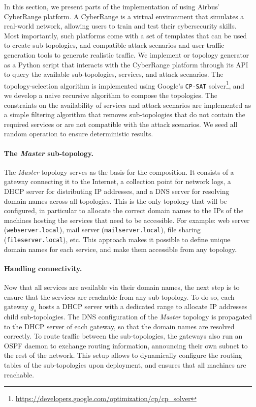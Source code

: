 In this section, we present parts of the implementation of \thecontrib using Airbus' CyberRange platform.
A CyberRange is a virtual environment that simulates a real-world network, allowing users to train and test their cybersecurity skills.
Most importantly, such platforms come with a set of templates that can be used to create sub-topologies, and compatible attack scenarios and user traffic generation tools to generate realistic traffic.
We implement or topology generator as a Python script that interacts with the CyberRange platform through its API to query the available sub-topologies, services, and attack scenarios.
The topology-selection algorithm is implemented using Google's \texttt{CP-SAT} solver\footnote{\url{https://developers.google.com/optimization/cp/cp_solver}}, and we develop a naive recursive algorithm to compose the topologies.
The constraints on the availability of services and attack scenarios are implemented as a simple filtering algorithm that removes sub-topologies that do not contain the required services or are not compatible with the attack scenarios.
We seed all random operation to ensure deterministic results.


\paragraph{The \emph{Master} sub-topology.}

The \emph{Master} topology serves as the basis for the composition.
It consists of a gateway connecting it to the Internet, a collection point for network logs, a DHCP server for distributing IP addresses, and a DNS server for resolving domain names across all topologies.
This is the only topology that will be configured, in particular to allocate the correct domain names to the IPs of the machines hosting the services that need to be accessible.
For example: web server (\texttt{webserver.local}), mail server (\texttt{mailserver.local}), file sharing (\texttt{fileserver.local}), etc.
This approach makes it possible to define unique domain names for each service, and make them accessible from any topology.


\paragraph{Handling connectivity.}

Now that all services are available via their domain names, the next step is to ensure that the services are reachable from any sub-topology.
To do so, each gateway $g_s$ hosts a DHCP server with a dedicated range to allocate IP addresses child sub-topologies.
The DNS configuration of the \emph{Master} topology is propagated to the DHCP server of each gateway, so that the domain names are resolved correctly.
To route traffic between the sub-topologies, the gateways also run an OSPF daemon to exchange routing information, announcing their own subnet to the rest of the network.
This setup allows to dynamically configure the routing tables of the sub-topologies upon deployment, and ensures that all machines are reachable.


